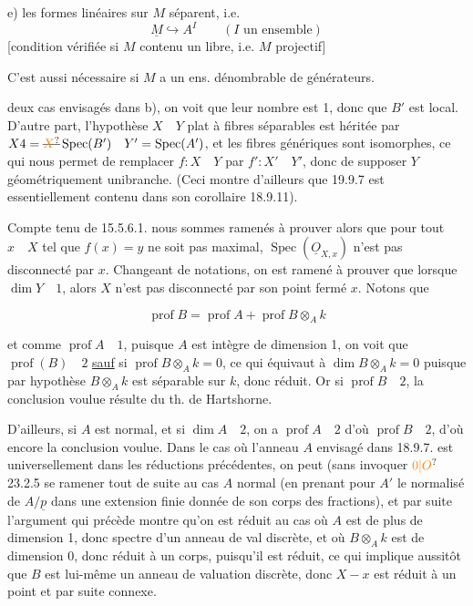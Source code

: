 e) les formes linéaires sur $M$ séparent, i.e.
\[
\underline M\hookrightarrow A^I \qquad (I\text{ un ensemble})
\]
[condition vérifiée si $M$ contenu  un libre,  i.e. $M$ projectif]

C'est aussi nécessaire si $M$ a un ens. dénombrable de générateurs.

deux cas envisagés dans b), on voit que leur nombre est 1, donc que $B'$ est local. D'autre part, l'hypothèse $X\quad Y$ plat à fibres séparables est héritée par $X4=\deleted{\unsure{X}}\operatorname{Spec}(B')\quad Y'=\operatorname{Spec}(A')$, et les fibres génériques sont isomorphes, ce qui nous permet de remplacer $f:X\quad Y$ par $f':X'\quad Y'$, donc de supposer $Y$ géométriquement unibranche. (Ceci montre d'ailleurs que 19.9.7 est essentiellement contenu dans son corollaire 18.9.11).

Compte tenu de 15.5.6.1. nous sommes ramenés à prouver alors que pour tout $x\quad X$ tel que $f(x)=y$ ne soit pas maximal, $\operatorname{Spec}(\underline O_{X,x})$ n'est pas disconnecté par $x$. Changeant de notations, on est ramené à prouver que lorsque $\dim Y\quad 1$, alors $X$ n'est pas disconnecté par son point fermé $x$. Notons que

\[
\operatorname{prof} B=\operatorname{prof} A+\operatorname{prof} B\otimes_A k
\]

et comme $\operatorname{prof} A\quad 1$, puisque $A$ est intègre de dimension 1, on voit que $\operatorname{prof}(B)\quad 2$ \uline{sauf} si $\operatorname{prof} B\otimes_A k=0$, ce qui équivaut à $\dim B\otimes_A k=0$ puisque par hypothèse $B\otimes_A k$ est séparable sur $k$, donc  réduit. Or si $\operatorname{prof} B\quad 2$, la conclusion voulue résulte du th. de Hartshorne. 

D'ailleurs, si $A$ est normal,  et si $\dim A\quad 2$, on a $\operatorname{prof} A\quad 2$ d'où $\operatorname{prof} B\quad 2$, d'où encore la conclusion voulue. Dans le cas où l'anneau $A$ envisagé dans 18.9.7. est universellement      dans les réductions précédentes, on peut (sans invoquer $\unsure{0|O}$ 23.2.5 se ramener  tout de suite au cas $A$ normal (en prenant pour $A'$
le normalisé de $A/\underline p$ dans une extension finie donnée de son corps des fractions), et par suite  l'argument qui précède montre qu'on est réduit au cas où $A$ est de plus de dimension 1, donc spectre d'un anneau de val discrète, et où $B\otimes_A k$ est de dimension 0, donc réduit à un corps, puisqu'il est réduit, ce qui implique aussitôt que $B$ est lui-même un anneau de valuation discrète, donc $X-x$ est réduit à un point et par suite connexe.

